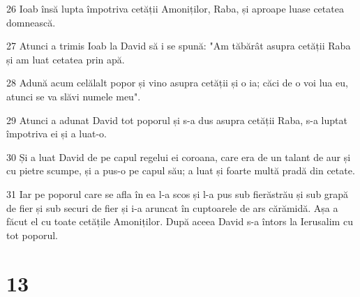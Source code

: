 \par 26 Ioab însă lupta împotriva cetății Amoniților, Raba, și aproape luase cetatea domnească.
\par 27 Atunci a trimis Ioab la David să i se spună: "Am tăbărât asupra cetății Raba și am luat cetatea prin apă.
\par 28 Adună acum celălalt popor și vino asupra cetății și o ia; căci de o voi lua eu, atunci se va slăvi numele meu".
\par 29 Atunci a adunat David tot poporul și s-a dus asupra cetății Raba, s-a luptat împotriva ei și a luat-o.
\par 30 Și a luat David de pe capul regelui ei coroana, care era de un talant de aur și cu pietre scumpe, și a pus-o pe capul său; a luat și foarte multă pradă din cetate.
\par 31 Iar pe poporul care se afla în ea l-a scos și l-a pus sub fierăstrău și sub grapă de fier și sub securi de fier și i-a aruncat în cuptoarele de ars cărămidă. Așa a făcut el cu toate cetățile Amoniților. După aceea David s-a întors la Ierusalim cu tot poporul.

\chapter{13}

